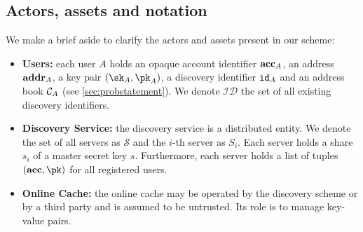 	\subsection{Actors, assets and notation}
	
		\noindent We make a brief aside to clarify the actors and assets present in our scheme:		
		\begin{itemize}
			\item \textbf{Users:} each user $A$ holds an opaque account identifier $\mathbf{acc}_A$, an address $\mathbf{addr}_A$, a key pair $(\sk_A,\pk_A)$, a discovery identifier $\mathtt{id}_A$ and an address book $\mathcal{C}_{A}$ (see \autoref{sec:probstatement}). We denote $\mathcal{ID}$ the set of all existing discovery identifiers.
			\item \textbf{Discovery Service:} the discovery service is a distributed entity. We denote the set of all servers as $\mathcal{S}$ and the $i$-th server as $S_i$. Each server holds a share $s_i$ of a master secret key $s$. Furthermore, each server holds a list of tuples $(\acc, \pk)$ for all registered users.
			\item \textbf{Online Cache:} the online cache may be operated by the discovery scheme or by a third party and is assumed to be untrusted. Its role is to manage key-value pairs.
			
			\end{itemize}
			
